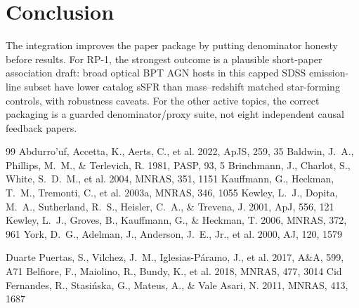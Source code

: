 \documentclass[twocolumn]{aastex702}
\begin{document}
\section{Conclusion}\label{sec:conclusion}
The integration improves the paper package by putting denominator honesty before results. For RP-1, the strongest outcome is a plausible short-paper association draft: broad optical BPT AGN hosts in this capped SDSS emission-line subset have lower catalog sSFR than mass--redshift matched star-forming controls, with robustness caveats. For the other active topics, the correct packaging is a guarded denominator/proxy suite, not eight independent causal feedback papers.


\begin{thebibliography}{99}
 Abdurro'uf, Accetta, K., Aerts, C., et al. 2022, ApJS, 259, 35
 Baldwin, J.~A., Phillips, M.~M., \& Terlevich, R. 1981, PASP, 93, 5
 Brinchmann, J., Charlot, S., White, S.~D.~M., et al. 2004, MNRAS, 351, 1151
 Kauffmann, G., Heckman, T.~M., Tremonti, C., et al. 2003a, MNRAS, 346, 1055
 Kewley, L.~J., Dopita, M.~A., Sutherland, R.~S., Heisler, C.~A., \& Trevena, J. 2001, ApJ, 556, 121
 Kewley, L.~J., Groves, B., Kauffmann, G., \& Heckman, T. 2006, MNRAS, 372, 961
 York, D.~G., Adelman, J., Anderson, J.~E., Jr., et al. 2000, AJ, 120, 1579


 Duarte Puertas, S., Vilchez, J.~M., Iglesias-Páramo, J., et al. 2017, A\&A, 599, A71
 Belfiore, F., Maiolino, R., Bundy, K., et al. 2018, MNRAS, 477, 3014
 Cid Fernandes, R., Stasińska, G., Mateus, A., \& Vale Asari, N. 2011, MNRAS, 413, 1687
\end{thebibliography}
\end{document}
